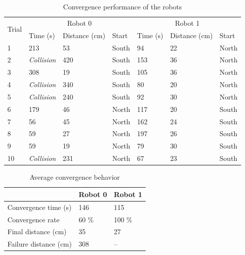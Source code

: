 \documentclass[]{article}
\newcommand{\ra}[1]{\renewcommand{\arraystretch}{#1}}
\begin{document}
\begin{table}[]
\centering
\ra{1.3}
\caption{Convergence performance of the robots}
\label{table:convergence}
\begin{tabular}{@{}lllllll@{}}
\toprule
\multirow{2}{*}{Trial} & \multicolumn{3}{c}{Robot 0}       & \multicolumn{3}{c}{Robot 1}      \\ \cmidrule(l){2-4} \cmidrule(l){5-7}
                       & Time (s)  & Distance (cm) & Start & Time (s) & Distance (cm) & Start \\ \midrule
1                      & 213       & 53            & South & 94       & 22            & North \\
2                      & \emph{Collision} & 420           & South & 153      & 36            & North \\
3                      & 308       & 19            & South & 105      & 36            & North \\
4                      & \emph{Collision} & 340           & South & 80       & 20            & North \\
5                      & \emph{Collision} & 240           & South & 92       & 30            & North \\
6                      & 179       & 46            & North & 117      & 20            & South \\
7                      & 56        & 45            & North & 162      & 24            & South \\
8                      & 59        & 27            & North & 197      & 26            & South \\
9                      & 59        & 19            & North & 79       & 30            & South \\
10                     & \emph{Collision} & 231           & North & 67       & 23            & South \\ \bottomrule
\end{tabular}
\end{table}

\begin{table}[]
\centering
\ra{1.3}
\caption{Average convergence behavior}
\label{table:averagecon}
\begin{tabular}{@{}lll@{}}
\toprule
                       & Robot 0        & Robot 1     \\ \midrule
Convergence time (s)   & 146            & 115         \\
Convergence rate       & 60 \%          & 100 \%      \\
Final distance (cm)    & 35             & 27          \\
Failure distance (cm)  & 308            & --          \\ \bottomrule
\end{tabular}
\end{table}
\end{document}
